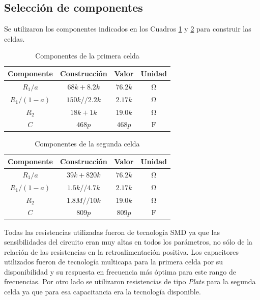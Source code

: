 \subsection{Selección de componentes}

Se utilizaron los componentes indicados en los Cuadros \ref{tab:e2 comp cell 1} y \ref{tab:e2 comp cell 2} para construir las celdas.

\begin{table}[ht]
\begin{center}
\begin{tabular}{||c|c|c|c||}
\hline
Componente	&	Construcción	&	Valor	&	Unidad	\\
\hline
$R_1/a$	&	$68k + 8.2 k$	&	$76.2 k$	&	$\si{\ohm}$	\\
$R_1/(1-a)$	&	$150k // 2.2 k$	&	$2.17 k$	&	$\si{\ohm}$	\\
$R_2$ &	$18 k + 1 k$	&$19.0k$&	$\si{\ohm}$	\\
$C$	&	$468 p$	&	$468 p$	&	$\si{\farad}$	\\
\hline
\end{tabular}
\caption{Componentes de la primera celda}
\label{tab:e2 comp cell 1}
\end{center}
\end{table}

\begin{table}[ht]
\begin{center}
\begin{tabular}{||c|c|c|c||}
\hline
Componente	&	Construcción	&	Valor	&	Unidad	\\
\hline
$R_1/a$	&	$39k + 820 k$	&	$76.2 k$	&	$\si{\ohm}$	\\
$R_1/(1-a)$	&	$1.5k // 4.7 k$	&	$2.17 k$	&	$\si{\ohm}$	\\
$R_2$ &	$1.8 M // 10 k$	&$19.0k$&	$\si{\ohm}$	\\
$C$	&	$809 p$	&	$809 p$	&	$\si{\farad}$	\\
\hline
\end{tabular}
\caption{Componentes de la segunda celda}
\label{tab:e2 comp cell 2}
\end{center}
\end{table}

Todas las resistencias utilizadas fueron de tecnología SMD ya que las sensibilidades del circuito eran muy altas en todos los parámetros, no sólo de la relación de las resistencias en la retroalimentación positiva. Los capacitores utilizados fueron de tecnología multicapa para la primera celda por su disponibilidad y su respuesta en frecuencia más óptima para este rango de frecuencias. Por otro lado se utilizaron resistencias de tipo \textit{Plate} para la segunda celda ya que para esa capacitancia era la tecnología disponible.

